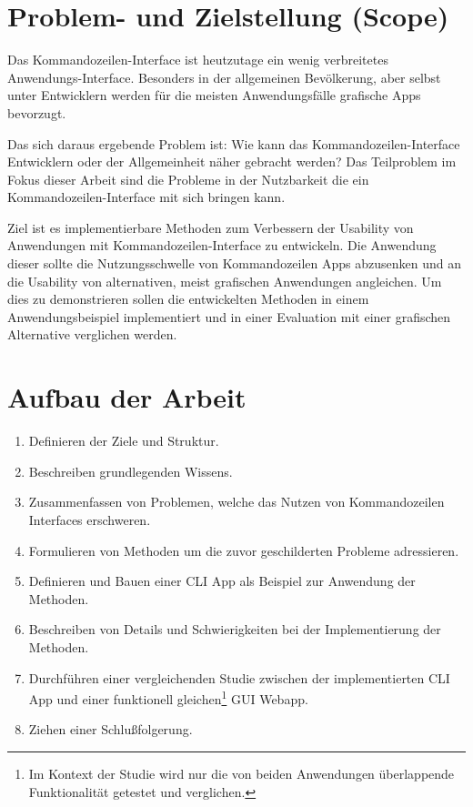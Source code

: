 \documentclass[oneside,bibliography=totocnumbered,BCOR=5mm]{scrbook}
\begin{document}
\section{Problem- und Zielstellung (Scope)}

Das Kommandozeilen-Interface ist heutzutage ein wenig verbreitetes
Anwendungs-Interface. Besonders in der allgemeinen Bevölkerung, aber selbst
unter Entwicklern werden für die meisten Anwendungsfälle grafische Apps
bevorzugt.

Das sich daraus ergebende Problem ist: Wie kann das Kommandozeilen-Interface
Entwicklern oder der Allgemeinheit näher gebracht werden? Das Teilproblem
im Fokus dieser Arbeit sind die Probleme in der Nutzbarkeit die ein
Kommandozeilen-Interface mit sich bringen kann.

Ziel ist es implementierbare Methoden zum Verbessern der Usability von
Anwendungen mit Kommandozeilen-Interface zu entwickeln. Die Anwendung dieser
sollte die Nutzungsschwelle von Kommandozeilen Apps abzusenken und an die
Usability von alternativen, meist grafischen Anwendungen angleichen. Um dies
zu demonstrieren sollen die entwickelten Methoden in einem Anwendungsbeispiel
implementiert und in einer Evaluation mit einer grafischen Alternative
verglichen werden.

\section{Aufbau der Arbeit}

\begin{enumerate}
  \item \textbf{}
    \smallbreak
    Definieren der Ziele und Struktur.
  \item \textbf{}
    \smallbreak
    Beschreiben grundlegenden Wissens.
  \item \textbf{}
    \smallbreak
    Zusammenfassen von Problemen, welche das Nutzen von Kommandozeilen Interfaces erschweren.
  \item \textbf{}
    \smallbreak
    Formulieren von Methoden um die zuvor geschilderten Probleme adressieren.
  \item \textbf{}
    \smallbreak
    Definieren und Bauen einer CLI App als Beispiel zur Anwendung der Methoden.
  \item \textbf{}
    \smallbreak
    Beschreiben von Details und Schwierigkeiten bei der Implementierung der Methoden.
  \item \textbf{}
    \smallbreak
    Durchführen einer vergleichenden Studie zwischen der implementierten CLI App
und einer funktionell gleichen\footnote{Im Kontext der Studie wird nur die von
beiden Anwendungen überlappende Funktionalität getestet und verglichen.} GUI
Webapp.
  \item \textbf{}
    \smallbreak
    Ziehen einer Schlußfolgerung.
\end{enumerate}
\end{document}
